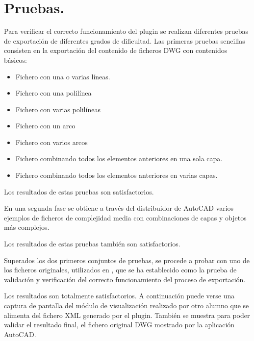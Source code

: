 \section{Pruebas.}

Para verificar el correcto funcionamiento del plugin se realizan diferentes pruebas de exportación de diferentes grados de dificultad. Las primeras pruebas sencillas consisten en la exportación del contenido de ficheros DWG con contenidos básicos:

\begin{itemize}

\item{Fichero con una o varias líneas.}
\item{Fichero con una polilínea}
\item{Fichero con varias polilíneas}
\item{Fichero con un arco}
\item{Fichero con varios arcos}
\item{Fichero combinando todos los elementos anteriores en una sola capa.}
\item{Fichero combinando todos los elementos anteriores en varias capas.}

\end{itemize}

Los resultados de estas pruebas son satisfactorios.

En una segunda fase se obtiene a través del distribuidor de AutoCAD varios ejemplos de ficheros de complejidad media con combinaciones de capas y objetos más complejos.

Los resultados de estas pruebas también son satisfactorios. 

Superados los dos primeros conjuntos de pruebas, se procede a probar con uno de los ficheros originales, utilizados en \cite{Miguel-Munoz}, que se ha establecido como la prueba de validación y verificación del correcto funcionamiento del proceso de exportación. 

Los resultados son totalmente satisfactorios. A continuación puede verse una captura de pantalla del módulo de visualización \cite{Luis-Fernandez-SSII} realizado por otro alumno que se alimenta del fichero XML generado por el plugin. También se muestra para poder validar el resultado final, el fichero original DWG mostrado por la aplicación AutoCAD.

